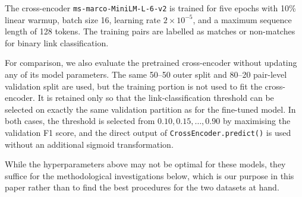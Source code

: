 The cross-encoder \texttt{ms-marco-MiniLM-L-6-v2} is trained for five epochs with
10\% linear warmup, batch size 16, learning rate $2\times10^{-5}$, and a maximum
sequence length of 128 tokens. The training pairs are labelled as matches or non-matches
for binary link classification.

For comparison, we also evaluate the pretrained cross-encoder without updating any of
its model parameters. The same 50--50 outer split and 80--20 pair-level validation split
are used, but the training portion is not used to fit the cross-encoder. It is retained only
so that the link-classification threshold can be selected on exactly the same validation
partition as for the fine-tuned model. In both cases, the threshold is selected from
$0.10,0.15,\ldots,0.90$ by maximising the validation F1 score, and the direct output of
\texttt{CrossEncoder.predict()} is used without an additional sigmoid transformation.

While the hyperparameters above may not be optimal for these models, they suffice for
the methodological investigations below, which is our purpose in this paper rather than
to find the best procedures for the two datasets at hand.


